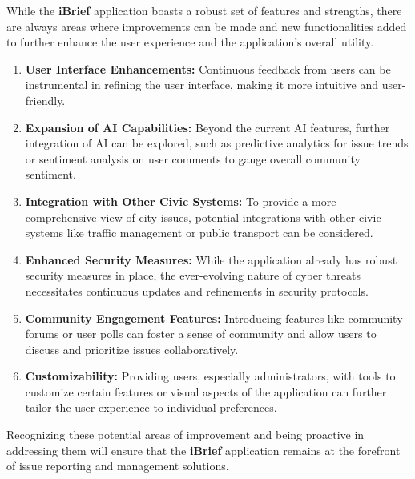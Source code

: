 While the \textbf{iBrief} application boasts a robust set of features and strengths, there are always areas where improvements can be made and new functionalities added to further enhance the user experience and the application's overall utility.

\begin{enumerate}

    \item \textbf{User Interface Enhancements:} Continuous feedback from users can be instrumental in refining the user interface, making it more intuitive and user-friendly.

    \item \textbf{Expansion of AI Capabilities:} Beyond the current AI features, further integration of AI can be explored, such as predictive analytics for issue trends or sentiment analysis on user comments to gauge overall community sentiment.

    \item \textbf{Integration with Other Civic Systems:} To provide a more comprehensive view of city issues, potential integrations with other civic systems like traffic management or public transport can be considered.

    \item \textbf{Enhanced Security Measures:} While the application already has robust security measures in place, the ever-evolving nature of cyber threats necessitates continuous updates and refinements in security protocols.

    \item \textbf{Community Engagement Features:} Introducing features like community forums or user polls can foster a sense of community and allow users to discuss and prioritize issues collaboratively.

    \item \textbf{Customizability:} Providing users, especially administrators, with tools to customize certain features or visual aspects of the application can further tailor the user experience to individual preferences.

\end{enumerate}

Recognizing these potential areas of improvement and being proactive in addressing them will ensure that the \textbf{iBrief} application remains at the forefront of issue reporting and management solutions.
